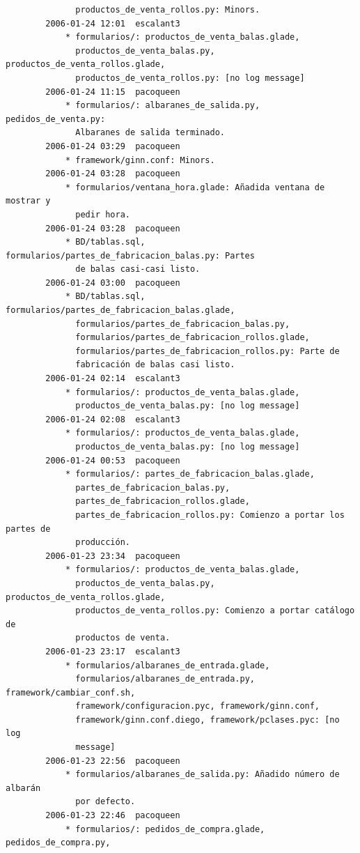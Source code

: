 \documentclass[a4paper]{article}
\begin{document}
\begin{verbatim}
              productos_de_venta_rollos.py: Minors.
        2006-01-24 12:01  escalant3
            * formularios/: productos_de_venta_balas.glade,
              productos_de_venta_balas.py, productos_de_venta_rollos.glade,
              productos_de_venta_rollos.py: [no log message]
        2006-01-24 11:15  pacoqueen
            * formularios/: albaranes_de_salida.py, pedidos_de_venta.py:
              Albaranes de salida terminado. 
        2006-01-24 03:29  pacoqueen
            * framework/ginn.conf: Minors.
        2006-01-24 03:28  pacoqueen
            * formularios/ventana_hora.glade: Añadida ventana de mostrar y
              pedir hora.
        2006-01-24 03:28  pacoqueen
            * BD/tablas.sql, formularios/partes_de_fabricacion_balas.py: Partes
              de balas casi-casi listo.
        2006-01-24 03:00  pacoqueen
            * BD/tablas.sql, formularios/partes_de_fabricacion_balas.glade,
              formularios/partes_de_fabricacion_balas.py,
              formularios/partes_de_fabricacion_rollos.glade,
              formularios/partes_de_fabricacion_rollos.py: Parte de
              fabricación de balas casi listo.
        2006-01-24 02:14  escalant3
            * formularios/: productos_de_venta_balas.glade,
              productos_de_venta_balas.py: [no log message]
        2006-01-24 02:08  escalant3
            * formularios/: productos_de_venta_balas.glade,
              productos_de_venta_balas.py: [no log message]
        2006-01-24 00:53  pacoqueen
            * formularios/: partes_de_fabricacion_balas.glade,
              partes_de_fabricacion_balas.py,
              partes_de_fabricacion_rollos.glade,
              partes_de_fabricacion_rollos.py: Comienzo a portar los partes de
              producción.
        2006-01-23 23:34  pacoqueen
            * formularios/: productos_de_venta_balas.glade,
              productos_de_venta_balas.py, productos_de_venta_rollos.glade,
              productos_de_venta_rollos.py: Comienzo a portar catálogo de
              productos de venta.
        2006-01-23 23:17  escalant3
            * formularios/albaranes_de_entrada.glade,
              formularios/albaranes_de_entrada.py, framework/cambiar_conf.sh,
              framework/configuracion.pyc, framework/ginn.conf,
              framework/ginn.conf.diego, framework/pclases.pyc: [no log
              message]
        2006-01-23 22:56  pacoqueen
            * formularios/albaranes_de_salida.py: Añadido número de albarán
              por defecto.
        2006-01-23 22:46  pacoqueen
            * formularios/: pedidos_de_compra.glade, pedidos_de_compra.py,

\end{verbatim}
\end{document}
